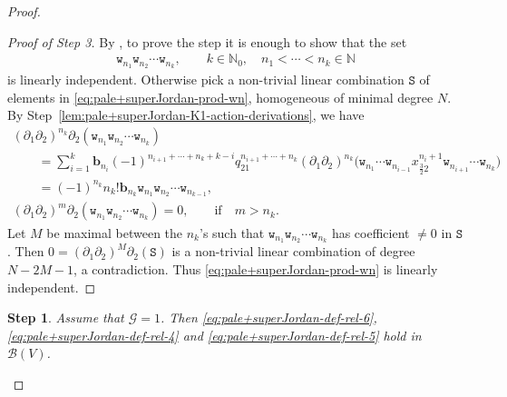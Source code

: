 \documentclass[10pt,a4paper]{amsart}
\numberwithin{equation}{section}
\newtheorem{stepv}{Step}
\newcommand{\toba}{\mathscr B}
\newcommand{\ghost}{\mathscr{G}}
\newcommand{\bb}{\mathbf b}
\newcommand{\N}{{\mathbb N}}
\newcommand{\wt}{\mathtt{w}}
\newcommand{\tresdos}{\frac{3}{2}}
\begin{document}
\begin{proof}
\begin{proof}[Proof of Step 3]
By \cite[Lemma~2.3.4]{AAH-triang}, to prove the step it is enough to show that the set
\begin{gather}\label{eq:pale+superJordan-prod-wn}
 \wt_{n_1}\wt_{n_2}\cdots \wt_{n_k}, \qquad
 k\in\mathbb N_0, \quad n_1< \cdots< n_k \in\N
\end{gather}
is linearly independent.
Otherwise pick a non-trivial linear combination $\mathtt S$ of elements in \eqref{eq:pale+superJordan-prod-wn},
homogeneous of minimal degree $N$. By Step~\ref{lem:pale+superJordan-K1-action-derivations}, we have
\begin{gather*}
(\partial_1\partial_2)^{n_k}\partial_2 (\wt_{n_1}\wt_{n_2}\cdots \wt_{n_k})
\\ \qquad
{}= \sum_{i=1}^k \bb_{n_i}(-1)^{n_{i+1}+\cdots+n_k+k-i} q_{21}^{n_{i+1}+\cdots+n_k}
(\partial_1\partial_2)^{n_k} \big(\wt_{n_1}\cdots \wt_{n_{i-1}} x_{\tresdos2}^{n_i+1}\wt_{n_{i+1}}\cdots \wt_{n_k}\big)
\\ \qquad
{} = (-1)^{n_k}n_k! \bb_{n_k} \wt_{n_1}\wt_{n_2}\cdots \wt_{n_{k-1}},
\\[1mm]
(\partial_1\partial_2)^{m}\partial_2 (\wt_{n_1}\wt_{n_2}\cdots \wt_{n_k}) =0, \qquad \text{if}\quad m>n_k.
\end{gather*}
Let $M$ be maximal between the $n_k$'s such that $\wt_{n_1}\wt_{n_2}\cdots \wt_{n_k}$ has
coefficient $\neq 0$ in $\mathtt S$.
Then $0=(\partial_1\partial_2)^{M}\partial_2(\mathtt S)$ is a non-trivial linear combination of degree $N-2M-1$,
a contradiction. Thus \eqref{eq:pale+superJordan-prod-wn} is linearly independent.
\end{proof}

\begin{stepv}
Assume that $\ghost = 1$. Then \eqref{eq:pale+superJordan-def-rel-6}, \eqref{eq:pale+superJordan-def-rel-4} and
\eqref{eq:pale+superJordan-def-rel-5} hold in $\toba(V)$.
\end{stepv}


\end{proof}
\end{document}
